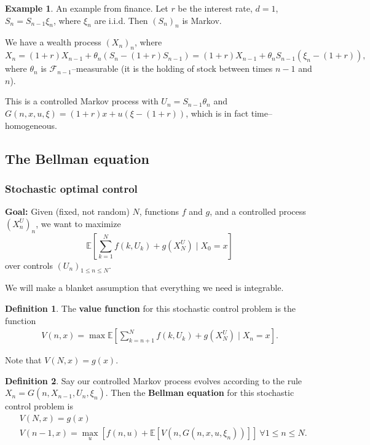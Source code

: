\documentclass{article}
\theoremstyle{definition}
\newtheorem{example}{Example}[section]
\newtheorem{defn}{Definition}[section]
\begin{document}
\begin{example}
    An example from finance. Let $r$ be the interest rate, $d=1$, $S_n = S_{n-1} \xi_n$, where $\xi_n$ are i.i.d. Then $(S_n)_n$ is Markov. 

    We have a wealth process $(X_n)_n$, where \[
    X_n = (1+r)X_{n-1} + \theta_n(S_n-(1+r)S_{n-1}) = (1+r)X_{n-1} + \theta_n S_{n-1}(\xi_n-(1+r)),
    \]
    where $\theta_n$ is $\mathcal{F}_{n-1}$--measurable (it is the holding of stock between times $n-1$ and $n$).
    \vspace{1mm}
    
    This is a controlled Markov process with $U_n = S_{n-1}\theta_n$ and $G(n,x,u,\xi) = (1+r)x+u(\xi-(1+r))$, which is in fact time--homogeneous. 
\end{example}

\subsection{The Bellman equation}

\subsubsection{Stochastic optimal control}

\textbf{Goal:} Given (fixed, not random) $N$, functions $f$ and $g$, and a controlled process $(X_n^U)_n$, we want to maximize \[
\mathbb{E}\left[\sum_{k=1}^{N} f(k,U_k)+g(X_N^U) \mid X_0=x \right]
\] over controls $(U_n)_{1\le n\le N}$.

We will make a blanket assumption that everything we need is integrable.

\begin{defn}
    The \textbf{value function} for this stochastic control problem is the function 
    \begin{align*}
        V(n,x) = \max \mathbb{E}\left[\sum_{k=n+1}^{N} f(k,U_k) + g(X_N^U) \mid X_n=x \right].
    \end{align*}
\end{defn}
Note that $V(N,x)=g(x)$. 

\begin{defn}
    Say our controlled Markov process evolves according to the rule $X_n=G(n,X_{n-1},U_n,\xi_n)$. Then the \textbf{Bellman equation} for this stochastic control problem is 
    \begin{align*}
        &V(N,x) = g(x) \\
        &V(n-1,x) = \max_{u} \left[f(n,u) + \mathbb{E}[V(n,G(n,x,u,\xi_n))] \right] ~\forall 1 \le n\le N.
    \end{align*} 
\end{defn}
\end{document}

